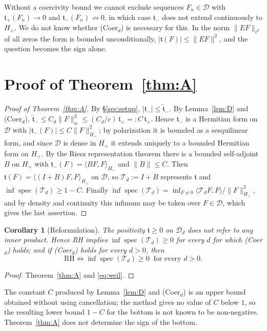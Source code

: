 \documentclass[11pt]{amsart}
\newtheorem{corollary}[theorem]{Corollary}
\theoremstyle{definition}
\theoremstyle{remark}
\newcommand{\spec}{\operatorname{spec}}
\newcommand{\tform}{\mathfrak t}
\newcommand{\tplus}{\mathfrak t_+}
\newcommand{\tminus}{\mathfrak t_-}
\newcommand{\ttilde}{\widetilde{\mathfrak t}_-}
\newcommand{\Hplus}{H_+}
\newcommand{\Top}{\mathcal T}
\newcommand{\Norm}[1]{\lVert #1 \rVert}
\begin{document}
Without a coercivity bound we cannot exclude sequences $F_n\in\mathcal D$ with
$\tplus(F_n)\to0$ and $\tminus(F_n)\not\to0$, in which case $\tminus$ does not extend
continuously to $\Hplus$. We do not know whether (Coer$_d$) is necessary for this. In the
norm $\Norm{EF}_{\ell^2}$ of all zeros the form is bounded unconditionally,
$|\tform(F)|\le\Norm{EF}^{2}$, and the question becomes the sign alone.

\section{Proof of Theorem~\ref{thm:A}}\label{sec:thmA}

\begin{proof}[Proof of Theorem~\ref{thm:A}]
By \S\ref{sec:setup}, $|\tminus|\le\ttilde$. By Lemma~\ref{lem:D} and (Coer$_d$),
$\ttilde\le C_d\Norm{F}_w^{2}\le (C_d/c)\,\tplus=:C\,\tplus$. Hence $\tminus$ is a
Hermitian form on $\mathcal D$ with $|\tminus(F)|\le C\Norm{F}_{\Hplus}^{2}$; by
polarization it is bounded as a sesquilinear form, and since $\mathcal D$ is dense in
$\Hplus$ it extends uniquely to a bounded Hermitian form on $\Hplus$. By the Riesz
representation theorem there is a bounded self-adjoint $B$ on $\Hplus$ with
$\tminus(F)=\langle BF,F\rangle_{\Hplus}$ and $\Norm{B}\le C$. Then
$\tform(F)=\langle(I+B)F,F\rangle_{\Hplus}$ on $\mathcal D$, so $\Top_d:=I+B$ represents
$\tform$ and $\inf\spec(\Top_d)\ge1-C$. Finally $\inf\spec(\Top_d)=\inf_{F\ne0}
\langle\Top_dF,F\rangle/\Norm{F}^{2}_{\Hplus}$, and by density and continuity this infimum
may be taken over $F\in\mathcal D$, which gives the last assertion.
\end{proof}

\begin{corollary}[Reformulation]\label{cor:Aprime}
The positivity $\tform\ge0$ on $\mathcal D_d$ does not refer to any inner product. Hence
RH implies $\inf\spec(\Top_d)\ge0$ for every $d$ for which (Coer$_d$) holds; and if
(Coer$_d$) holds for every $d>0$, then
\[
\mathrm{RH}\iff\inf\spec(\Top_d)\ge0\ \text{ for every } d>0 .
\]
\end{corollary}
\begin{proof}
Theorem~\ref{thm:A} and \eqref{eq:weil}.
\end{proof}

The constant $C$ produced by Lemma~\ref{lem:D} and (Coer$_d$) is an upper bound obtained
without using cancellation; the method gives no value of $C$ below $1$, so the resulting
lower bound $1-C$ for the bottom is not known to be non-negative. Theorem~\ref{thm:A} does
not determine the sign of the bottom.
\end{document}
